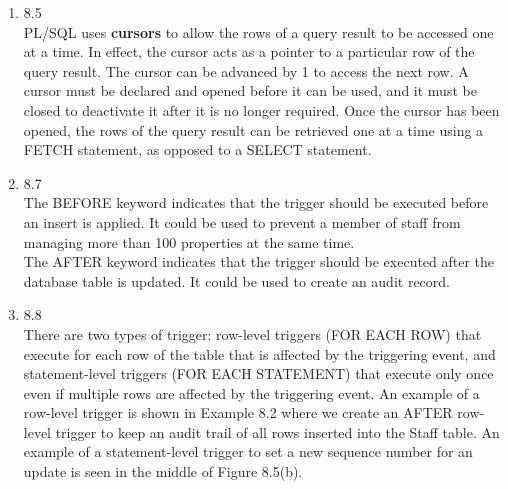 \documentclass[10pt]{article}
\begin{document}
\begin{enumerate}
\item 8.5\\
  PL/SQL uses \textbf{cursors} to allow the rows of a query result to be
  accessed one at a time. In effect, the cursor acts as a pointer to a
  particular row of the query result. The cursor can be advanced by 1
  to access the next row. A cursor must be declared and opened before
  it can be used, and it must be closed to deactivate it after it is
  no longer required. Once the cursor has been opened, the rows of the
  query result can be retrieved one at a time using a FETCH statement,
  as opposed to a SELECT statement.

\item 8.7\\
  The BEFORE keyword indicates that the trigger should be executed
  before an insert is applied. It could be used to prevent a member of
  staff from managing more than 100 properties at the same time.\\

  The AFTER keyword indicates that the trigger should be executed
  after the database table is updated. It could be used to create an
  audit record.

\item 8.8\\
  There are two types of trigger: row-level triggers (FOR EACH ROW)
  that execute for each row of the table that is affected by the
  triggering event, and statement-level triggers (FOR EACH STATEMENT)
  that execute only once even if multiple rows are affected by the
  triggering event. An example of a row-level trigger is shown in
  Example 8.2 where we create an AFTER row-level trigger to keep an
  audit trail of all rows inserted into the Staff table. An example of
  a statement-level trigger to set a new sequence number for an update
  is seen in the middle of Figure 8.5(b).


\end{enumerate}
\end{document}
